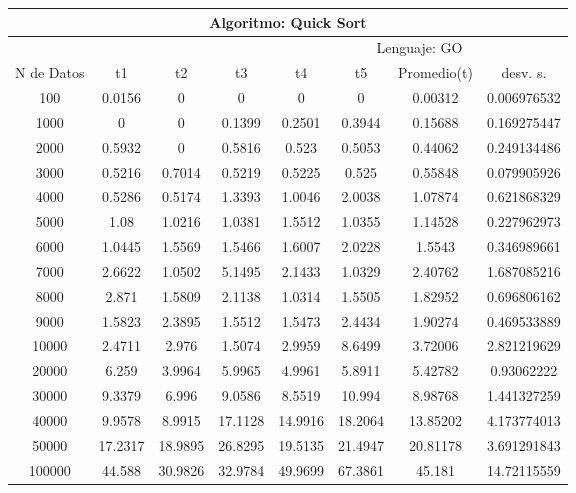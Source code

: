 \documentclass{article}
\begin{document}
        \begin{table}[]
        \begin{tabular}{|c|c|c|c|c|c|c|c| }
            \hline
            \multicolumn{8}{|c|}{Algoritmo: Quick Sort} \\ \hline
            \multicolumn{4}{|c|}{} & \multicolumn{4}{c|}{Lenguaje: GO} \\ \hline
              N de Datos &     t1    &  t2         &  t3          &   t4        &    t5     &   Promedio(t)       & desv. s. \\ \hline  
                100	&0.0156&0	&0	&0	&0	&0.00312	&0.006976532\\ \hline
                1000	&0	&0	&0.1399	&0.2501	&0.3944	&0.15688	&0.169275447\\ \hline
                2000	&0.5932	&0	&0.5816	&0.523	&0.5053	&0.44062	&0.249134486\\ \hline
                3000	&0.5216	&0.7014	&0.5219	&0.5225	&0.525	&0.55848	&0.079905926\\ \hline
                4000	&0.5286	&0.5174	&1.3393	&1.0046	&2.0038	&1.07874	&0.621868329\\ \hline
                5000	&1.08	&1.0216	&1.0381	&1.5512	&1.0355	&1.14528	&0.227962973\\ \hline
                6000	&1.0445	&1.5569	&1.5466	&1.6007	&2.0228	&1.5543	&0.346989661\\ \hline
                7000	&2.6622	&1.0502	&5.1495	&2.1433	&1.0329	&2.40762	&1.687085216\\ \hline
                8000	&2.871	&1.5809	&2.1138	&1.0314	&1.5505	&1.82952	&0.696806162\\ \hline
                9000	&1.5823	&2.3895	&1.5512	&1.5473	&2.4434	&1.90274	&0.469533889\\ \hline
                10000	&2.4711	&2.976	&1.5074	&2.9959	&8.6499	&3.72006	&2.821219629\\ \hline
                20000	&6.259	&3.9964	&5.9965	&4.9961	&5.8911	&5.42782	&0.93062222\\ \hline
                30000	&9.3379	&6.996	&9.0586	&8.5519	&10.994	&8.98768	&1.441327259\\ \hline
                40000	&9.9578	&8.9915	&17.1128	&14.9916	&18.2064	&13.85202	&4.173774013\\ \hline
                50000	&17.2317	&18.9895	&26.8295	&19.5135	&21.4947	&20.81178	&3.691291843\\ \hline
                100000	&44.588	&30.9826	&32.9784	&49.9699	&67.3861	&45.181	&14.72115559\\ \hline

\end{tabular}
\end{table}
\end{document}
